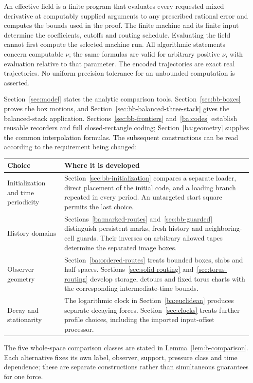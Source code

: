 An effective field is a finite program that evaluates every requested
mixed derivative at computably supplied arguments to any prescribed
rational error and computes the bounds used in the proof. The finite
machine and its finite input determine the coefficients, cutoffs and
routing schedule. Evaluating the field cannot first compute the selected
machine run. All algorithmic statements concern computable $\nu$;
the same formulas are valid for arbitrary positive $\nu$, with evaluation
relative to that parameter. The encoded trajectories are exact real
trajectories. No uniform precision tolerance for an unbounded computation
is asserted.

Section~\ref{sec:model} states the analytic comparison tools.
Section~\ref{sec:bb-boxes} proves the box motions, and
Section~\ref{sec:bb-balanced-three-stack} gives the balanced-stack application.
Sections~\ref{sec:bb-frontiers} and~\ref{ba:codes} establish reusable
recorders and full closed-rectangle coding; Section~\ref{ba:geometry}
supplies the common interpolation formulas. The subsequent constructions
can be read according to the requirement being changed:
\begin{center}
\begin{tabular}{@{}p{}p{}@{}}
\toprule
Choice & Where it is developed \\
\midrule
Initialization and time periodicity &
Section~\ref{sec:bb-initialization} compares a separate loader, direct
placement of the initial code, and a loading branch repeated in every
period. An untargeted start square permits the last choice. \\[4pt]
History domains &
Sections~\ref{ba:marked-routes} and~\ref{sec:bb-guarded} distinguish
persistent marks, fresh history and neighboring-cell guards. Their
inverses on arbitrary allowed tapes determine the separated image boxes.
\\[4pt]
Observer geometry &
Section~\ref{ba:ordered-routes} treats bounded boxes, slabs and
half-spaces. Sections~\ref{sec:solid-routing} and~\ref{sec:torus-routing}
develop storage, detours and fixed torus charts with the corresponding
intermediate-time bounds. \\[4pt]
Decay and stationarity &
The logarithmic clock in Section~\ref{ba:euclidean} produces separate
decaying forces. Section~\ref{sec:clocks} treats further profile choices,
including the imported input-offset processor. \\
\bottomrule
\end{tabular}
\end{center}
The five whole-space comparison classes are stated in
Lemma~\ref{lem:b-comparison}. Each alternative fixes its own label,
observer, support, pressure class and time dependence; these are separate
constructions rather than simultaneous guarantees for one force.
